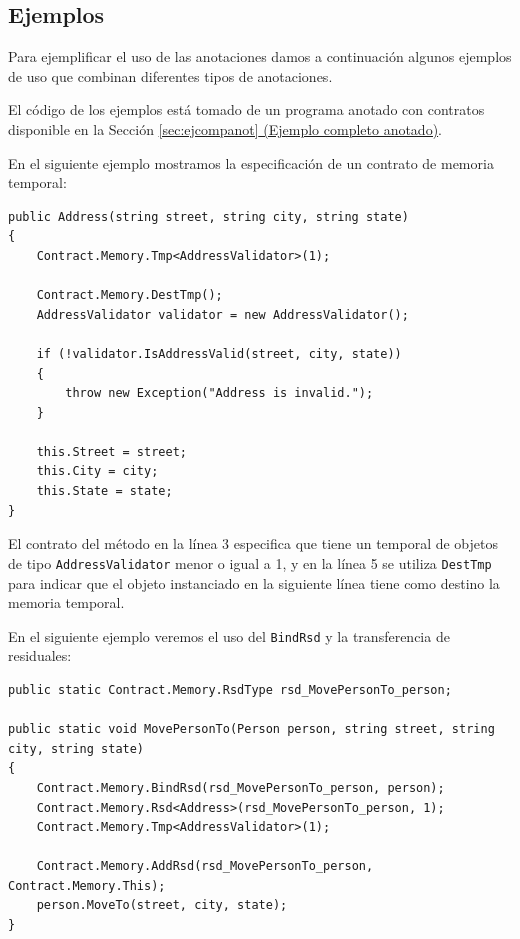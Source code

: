 \documentclass[12pt,a4paper]{article}
\newcommand\mono[1]{\texttt{#1}}
\begin{document}
		\subsection{Ejemplos}
			Para ejemplificar el uso de las anotaciones damos a continuación algunos ejemplos de uso que combinan diferentes tipos de anotaciones.

			El código de los ejemplos está tomado de un programa anotado con contratos disponible en la Sección \hyperref[sec:ejcompanot]{\ref*{sec:ejcompanot} (Ejemplo completo anotado)}.

			En el siguiente ejemplo mostramos la especificación de un contrato de memoria temporal:
			\vspace{15pt}
			\begin{small}
			\begin{lstlisting}[caption=Especificación de temporal, label=ejtmp]
public Address(string street, string city, string state)
{
	Contract.Memory.Tmp<AddressValidator>(1);

	Contract.Memory.DestTmp();
	AddressValidator validator = new AddressValidator();

	if (!validator.IsAddressValid(street, city, state))
	{
		throw new Exception("Address is invalid.");
	}

	this.Street = street;
	this.City = city;
	this.State = state;
}
			\end{lstlisting}
			\end{small}

			El contrato del método en la línea 3 especifica que tiene un temporal de objetos de tipo \mono{AddressValidator} menor o igual a 1, y en la línea 5 se utiliza \mono{DestTmp} para indicar que el objeto instanciado en la siguiente línea tiene como destino la memoria temporal.

			En el siguiente ejemplo veremos el uso del \mono{BindRsd} y la transferencia de residuales:

			\vspace{15pt}
			\begin{footnotesize}
			\begin{lstlisting}[caption=Bind y transferencia de residuales, label=bindytransf]
public static Contract.Memory.RsdType rsd_MovePersonTo_person;

public static void MovePersonTo(Person person, string street, string city, string state)
{
	Contract.Memory.BindRsd(rsd_MovePersonTo_person, person);
	Contract.Memory.Rsd<Address>(rsd_MovePersonTo_person, 1);
	Contract.Memory.Tmp<AddressValidator>(1);

	Contract.Memory.AddRsd(rsd_MovePersonTo_person, Contract.Memory.This);
	person.MoveTo(street, city, state);
}
			\end{lstlisting}
			\end{footnotesize}
\end{document}
